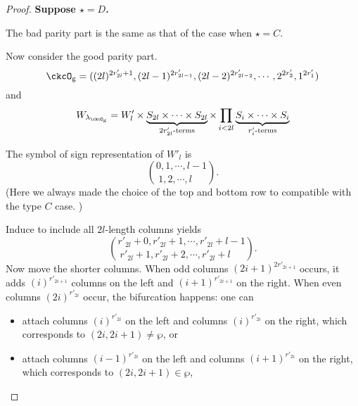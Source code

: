 \documentclass[12pt,a4paper]{amsart}
\numberwithin{equation}{section}
\theoremstyle{remark}
\def\lamckg{\lambda_{\ckcO_{\mathrm g}}}
\begin{document}
\begin{proof}
{{      {\bf Suppose $\star=D$.}

      The bad parity part is the same as that of the case when $\star = C$.

      Now consider the good parity part.
      \[
        \ckcO_{\mathrm g} = ((2l)^{2r'_{2l}+1}, (2l-1)^{2r'_{2l-1}}, (2l-2)^{2r'_{2l-2}}, \cdots, 2^{2r'_{2}}, 1^{2r'_{1}} )
      \]
      and
      \[
        W_{\lamckg} = W'_{l}\times \underbrace{S_{2l}\times \cdots \times S_{2l}}_{2r'_{2l}\text{-terms}} \times \prod_{i<2l} \underbrace{S_{i}\times \cdots\times S_{i}}_{r'_{i}\text{-terms}}
      \]

      The symbol of sign representation of $W'_{l}$ is
      \[
        \binom{0,1, \cdots, l-1}{1,2, \cdots, l\phantom{-1}}.
      \]
      (Here we always made the choice of the top and bottom row to compatible
      with the type $C$ case. )

      Induce to include all $2l$-length columns yields
      \[
        \binom{r'_{2l}+0,r'_{2l}+1, \cdots, r'_{2l}+l-1}{ r'_{2l}+1,r'_{2l}+2, \cdots, r'_{2l}+l\phantom{-1}}.
      \]
      Now move the shorter columns. When odd columns $(2i+1)^{2r'_{2i+1}}$
      occurs, it adds $(i)^{r'_{2i+1}}$ columns on the left and
      $(i+1)^{r'_{2i+1}}$ on the right. When even columns $(2i)^{r'_{2i}}$
      occur, the bifurcation happens: one can
      \begin{itemize}
        \item attach columns $(i)^{r'_{2i}}$ on the left and columns
              $(i)^{r'_{2i}}$ on the right, which corresponds to
              $(2i,2i+1)\neq \wp$, or
        \item attach columns $(i-1)^{r'_{2i}}$ on the left and columns
              $(i+1)^{r'_{2i}}$ on the right, which corresponds to
              $(2i,2i+ 1)\in \wp$,
      \end{itemize}

}}
\end{proof}
\end{document}
